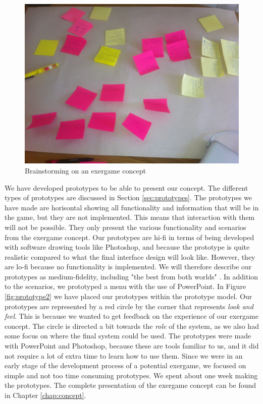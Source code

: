 \begin{figure} [H]
\centering
\includegraphics[scale=0.05]{brainstorming}
\caption[Brainstorming on an exergame concept]{Brainstorming on an exergame concept}
\label{fig:brainstorming}
\end{figure} 

We have developed prototypes to be able to present our concept. The different types of prototypes are discussed in Section \ref{sec:prototypes}. The prototypes we have made are horisontal showing all functionality and information that will be in the game, but they are not implemented. This means that interaction with them will not be possible. They only present the various functionality and scenarios from the exergame concept. Our prototypes are hi-fi in terms of being developed with software drawing tools like Photoshop, and because the prototype is quite realistic compared to what the final interface design will look like. However, they are lo-fi because no functionality is implemented. We will therefore describe our prototypes as medium-fidelity, including "the best from both worlds" \cite{mediumfidelity}. In addition to the scenarios, we prototyped a menu with the use of PowerPoint. In Figure \ref{fig:prototype2} we have placed our prototypes within the prototype model. Our prototypes are represented by a red circle by the corner that represents \emph{look and feel}. This is because we wanted to get feedback on the experience of our exergame concept. The circle is directed a bit towards the \emph{role} of the system, as we also had some focus on where the final system could be used. The prototypes were made with PowerPoint and Photoshop, because these are tools familiar to us, and it did not require a lot of extra time to learn how to use them. Since we were in an early stage of the development process of a potential exergame, we focused on simple and not too time consuming prototypes. We spent about one week making the prototypes. 
The complete presentation of the exergame concept can be found in Chapter \ref{chap:concept}.

